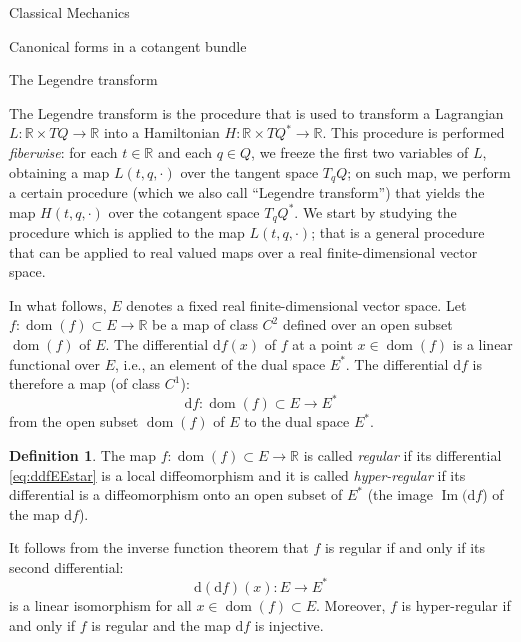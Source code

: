 \documentclass[oneside,a4paper,11pt]{amsbook}
\newcommand{\R}{\mathds R}
\newcommand{\dd}{\mathrm d}
\DeclareMathOperator{\Img}{Im}
\DeclareMathOperator{\Dom}{dom}
\theoremstyle{remark}\newtheorem{exercise}{Exercise}[chapter]
\theoremstyle{plain}\newtheorem{teo}{Theorem}[section]
\theoremstyle{plain}\newtheorem{lem}[teo]{Lemma}
\theoremstyle{plain}\newtheorem{prop}[teo]{Proposition}
\theoremstyle{plain}\newtheorem{cor}[teo]{Corollary}
\theoremstyle{definition}\newtheorem{defin}[teo]{Definition}
\theoremstyle{remark}\newtheorem{rem}[teo]{Remark}
\theoremstyle{definition}\newtheorem{notation}[teo]{Notation}
\theoremstyle{definition}\newtheorem{convention}[teo]{Convention}
\theoremstyle{definition}\newtheorem{example}[teo]{Example}
\numberwithin{section}{chapter}
\numberwithin{equation}{section}
\begin{document}
\begin{chapter}{Classical Mechanics}
\begin{section}{Canonical forms in a cotangent bundle}
\end{section}

\begin{section}{The Legendre transform}

The Legendre transform is the procedure that is used to transform a Lagrangian $L:\R\times TQ\to\R$ into a Hamiltonian $H:\R\times TQ^*\to\R$.
This procedure is performed {\em fiberwise}: for each $t\in\R$ and each $q\in Q$, we freeze the first two variables of $L$, obtaining a map
$L(t,q,\cdot)$ over the tangent space $T_qQ$; on such map, we perform a certain procedure (which we also call ``Legendre transform'')
that yields the map $H(t,q,\cdot)$ over the cotangent space $T_qQ^*$. We start by studying the procedure which is applied to the map $L(t,q,\cdot)$;
that is a general procedure that can be applied to real valued maps over a real finite-dimensional vector space.

In what follows, $E$ denotes a fixed real finite-dimensional vector space. Let $f:\Dom(f)\subset E\to\R$ be a map of class $C^2$ defined over an
open subset $\Dom(f)$ of $E$. The differential $\dd f(x)$ of $f$ at a point $x\in\Dom(f)$ is a linear functional over $E$, i.e., an element
of the dual space $E^*$. The differential $\dd f$ is therefore a map (of class $C^1$):
\begin{equation}\label{eq:ddfEEstar}
\dd f:\Dom(f)\subset E\longrightarrow E^*
\end{equation}
from the open subset $\Dom(f)$ of $E$ to the dual space $E^*$.

\begin{defin}
The map $f:\Dom(f)\subset E\to\R$ is called {\em regular\/} if its differential \eqref{eq:ddfEEstar} is a local diffeomorphism and it is called
{\em hyper-regular\/} if its differential is a diffeomorphism onto an open subset of $E^*$ (the image $\Img(\dd f$)
of the map $\dd f$).
\end{defin}
It follows from the inverse function theorem that $f$ is regular if and only if its second differential:
\[\dd(\dd f)(x):E\longrightarrow E^*\]
is a linear isomorphism for all $x\in\Dom(f)\subset E$. Moreover, $f$ is hyper-regular if and only if $f$ is regular and the map $\dd f$ is injective.


\end{section}
\end{chapter}
\end{document}
